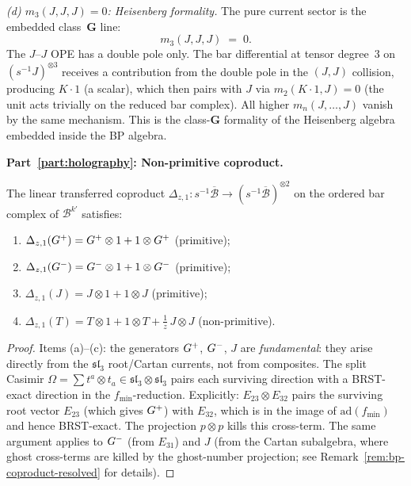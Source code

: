 \begin{computation}[The ordered bar complex of the
Bershadsky--Polyakov algebra
$\mathcal{B}^{k'} = W_{k'}(\mathfrak{sl}_3,f_{\min})$;
\ClaimStatusProvedHere]
\emph{(d) $m_3(J,J,J)=0$: Heisenberg formality.}
The pure current sector is the embedded class~$\mathbf{G}$ line:
\begin{equation}\label{eq:bp-m3-JJJ}
m_3(J,J,J) \;=\; 0.
\end{equation}
The $J$--$J$ OPE has a double pole only. The bar
differential at tensor degree~$3$ on
$(s^{-1}J)^{\otimes 3}$ receives a contribution from
the double pole in the $(J,J)$ collision, producing
$K\cdot 1$ (a scalar), which then pairs with $J$ via
$m_2(K\cdot 1,J)=0$ (the unit acts trivially on the
reduced bar complex). All higher $m_n(J,\dots,J)$
vanish by the same mechanism.  This is the class-$\mathbf G$
formality of the Heisenberg algebra embedded inside the BP algebra.

\medskip
\noindent\textbf{Part~\ref{part:holography}: Non-primitive coproduct.}

\begin{proposition}
\label{prop:bp-coproduct}
The linear transferred coproduct
$\Delta_{z,1}\colon s^{-1}\overline{\mathcal{B}}
\to (s^{-1}\overline{\mathcal{B}})^{\otimes 2}$
on the ordered bar complex of $\mathcal{B}^{k'}$ satisfies:
\begin{enumerate}[label=\textup{(\alph*)}]
\item $\Delta_{z,1}(G^+)
= G^+\otimes 1 + 1\otimes G^+$
\quad\textup{(primitive)};
\item $\Delta_{z,1}(G^-)
= G^-\otimes 1 + 1\otimes G^-$
\quad\textup{(primitive)};
\item $\Delta_{z,1}(J)
= J\otimes 1 + 1\otimes J$
\quad\textup{(primitive)};
\item $\Delta_{z,1}(T)
= T\otimes 1 + 1\otimes T
+ \frac{1}{z}\,J\otimes J$
\quad\textup{(non-primitive)}.
\end{enumerate}
\end{proposition}

\begin{proof}
Items (a)--(c): the generators $G^+$, $G^-$, $J$ are
\emph{fundamental}: they arise directly from the
$\mathfrak{sl}_3$ root/Cartan currents, not from
composites. The split Casimir
$\Omega=\sum t^a\otimes t_a\in
\mathfrak{sl}_3\otimes\mathfrak{sl}_3$
pairs each surviving direction with a BRST-exact direction
in the $f_{\min}$-reduction. Explicitly:
$E_{23}\otimes E_{32}$ pairs the surviving root vector
$E_{23}$ (which gives $G^+$) with $E_{32}$, which is in the
image of $\mathrm{ad}(f_{\min})$ and hence BRST-exact.
The projection $p\otimes p$ kills this cross-term.
The same argument applies to $G^-$ (from $E_{31}$)
and $J$ (from the Cartan subalgebra, where ghost
cross-terms are killed by the ghost-number projection;
see Remark~\ref{rem:bp-coproduct-resolved} for details).


\end{proof}
\end{computation}
